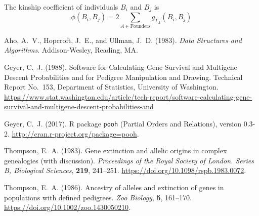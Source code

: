 \documentclass[11pt]{article}
\begin{document}
The kinship coefficient of individuals $B_i$ and $B_j$ is
\begin{equation} \label{eq:kinship}
   \phi(B_i, B_j) = 2 \sum_{A \in \text{Founders}} g_{T_A}(B_i, B_j)
\end{equation}

\begin{thebibliography}{}

Aho, A.~V., Hopcroft, J.~E., and Ullman, J.~D. (1983).
\newblock \emph{Data Structures and Algorithms}.
\newblock Addison-Wesley, Reading, MA.

Geyer, C.~J. (1988).
\newblock Software for Calculating Gene Survival and Multigene Descent
    Probabilities and for Pedigree Manipulation and Drawing.
\newblock Technical Report No.~153, Department of Statistics,
    University of Washington.
\newblock \url{https://www.stat.washington.edu/article/tech-report/software-calculating-gene-survival-and-multigene-descent-probabilities-and}

Geyer, C.~J. (2017).
\newblock R package \texttt{pooh} (Partial Orders and Relations), version 0.3-2.
\newblock \url{http://cran.r-project.org/package=pooh}.

Thompson, E.~A. (1983).
\newblock Gene extinction and allelic origins in complex genealogies
    (with discussion).
\newblock \emph{Proceedings of the Royal Society of London. Series B,
    Biological Sciences}, \textbf{219}, 241--251.
\newblock \url{https://doi.org/10.1098/rspb.1983.0072}.

Thompson, E.~A. (1986).
\newblock Ancestry of alleles and extinction of genes in populations with
    defined pedigrees.
\newblock \emph{Zoo Biology}, \textbf{5}, 161--170.
\newblock \url{https://doi.org/10.1002/zoo.1430050210}.

\end{thebibliography}
\end{document}
